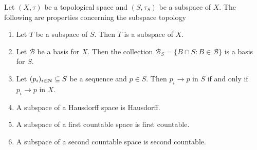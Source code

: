 \begin{proposition}\label{prop: subspace properties}
Let \((X, \tau)\) be a topological space and \((S, \tau_S)\) be a
subspace of \(X\). The following are properties concerning the subspace
topology
\begin{enumerate}[(SP1)]
\item\label{prop: subspace transitivity} Let \(T\) be a subspace of \(S\). Then
  \(T\) is a subspace of \(X\).  \item\label{prop: basis for subspace} Let
  \(\mathcal B\) be a basis for \(X\). Then the collection
  \(\mathcal B_S = \{B \cap S \colon B \in \mathcal B\}\) is a basis for \(S\).
  \item\label{prop: convergence subspace}
    Let \((p_i)_{i \in \mathbf{N}} \subseteq S\) be a sequence and \(p \in
    S\). Then \(p_i \to p\) in \(S\) if and only if \(p_i \to p\) in \(X\).
  \item\label{prop: Hausdorff implies Hausdorff subspace}
    A subspace of a Hausdorff space is Hausdorff.
  \item\label{prop: firs count implies first count subspace}
    A subspace of a first countable space is first countable.
  \item\label{prop: sec count implies sec count subspace}
    A subspace of a second countable space is second countable.
\end{enumerate}
\end{proposition}


